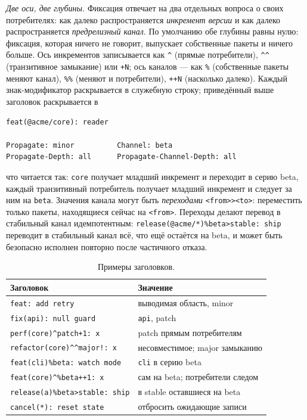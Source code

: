 \documentclass[sigconf,nonacm]{acmart}
\theoremstyle{acmplain}
\theoremstyle{acmdefinition}
\theoremstyle{acmplain}
\newcommand{\code}[1]{\texttt{#1}}
\begin{document}
\emph{Две оси, две глубины.} Фиксация отвечает на два отдельных вопроса
о своих потребителях: как далеко распространяется \emph{инкремент
версии} и как далеко распространяется \emph{предрелизный канал}. По
умолчанию обе глубины равны нулю: фиксация, которая ничего не говорит,
выпускает собственные пакеты и ничего больше. Ось инкрементов
записывается как \code{\^{}} (прямые потребители), \code{\^{}\^{}}
(транзитивное замыкание) или \code{+N}; ось каналов --- как \code{\%}
(собственные пакеты меняют канал), \code{\%\%} (меняют и потребители),
\code{++N} (насколько далеко). Каждый знак-модификатор раскрывается в
служебную строку; приведённый выше заголовок раскрывается в
\begin{small}
\begin{verbatim}
feat(@acme/core): reader

Propagate: minor          Channel: beta
Propagate-Depth: all      Propagate-Channel-Depth: all
\end{verbatim}
\end{small}
что читается так: \code{core} получает младший инкремент и переходит в
серию beta, каждый транзитивный потребитель получает младший инкремент и
следует за ним на \code{beta}. Значения канала могут быть
\emph{переходами} \code{<from>><to>}: переместить только пакеты,
находящиеся сейчас на \code{<from>}. Переходы делают перевод в
стабильный канал идемпотентным:
\code{release(@acme/*)\%beta>stable:~ship} переводит в стабильный канал
всё, что ещё остаётся на beta, и может быть безопасно исполнен повторно
после частичного отказа.

\begin{table}[t]
\caption{Примеры заголовков.}
\label{tab:headers}
\small
\begin{tabular}{@{}ll@{}}
\toprule
Заголовок & Значение \\
\midrule
\code{feat: add retry} & выводимая область, minor \\
\code{fix(api): null guard} & \code{api}, patch \\
\code{perf(core)\^{}patch+1: x} & patch прямым потребителям \\
\code{refactor(core)\^{}\^{}major!: x} & несовместимое; major замыканию \\
\code{feat(cli)\%beta: watch mode} & \code{cli} в серию beta \\
\code{feat(core)\^{}\%beta++1: x} & сам на beta; потребители следом \\
\code{release(a)\%beta>stable: ship} & в stable оставшиеся на beta \\
\code{cancel(*): reset state} & отбросить ожидающие записи \\
\bottomrule
\end{tabular}
\end{table}
\end{document}
